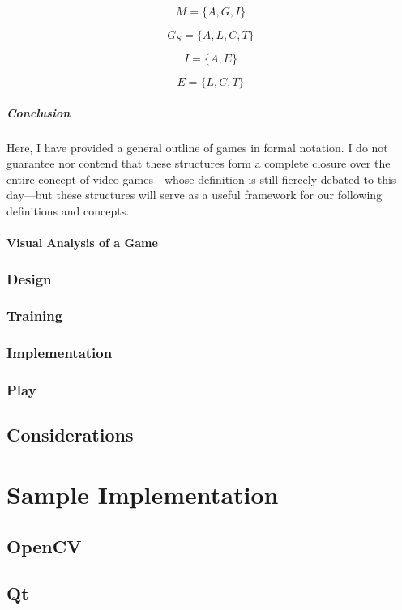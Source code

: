 \documentclass{report}
\begin{document}
$$
M = \{A, G, I\}
$$

$$
G_S = \{ A, L, C, T \}
$$

$$I = \{A, E\}$$

$$E = \{L, C, T\}$$


\paragraph{Conclusion}
Here, I have provided a general outline of games in formal notation. I do not guarantee nor contend that these structures form a complete closure over the entire concept of video games---whose definition is still fiercely debated to this day\cite{Knoop_2021}---but these structures will serve as a useful framework for our following definitions and concepts.

\subsubsection{Visual Analysis of a Game}

\subsection{Design}
\subsection{Training}
\subsection{Implementation}
\subsection{Play}
\section{Considerations}



\chapter{Sample Implementation}
\section{OpenCV}
\section{Qt}
\end{document}
